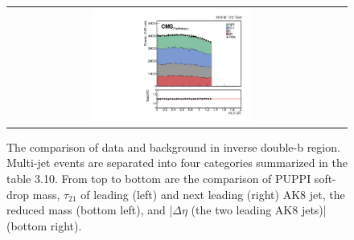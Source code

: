 \begin{figure}[t]
\begin{tabular}{cc}
    \includegraphics[width=0.5\textwidth]{Figures/dataMC_trig_antiDBT/deltaEta.pdf} \\
  \end{tabular}
  \caption{The comparison of data and background in inverse double-b region. Multi-jet events are separated into four categories summarized in the table 3.10. From top to bottom are the comparison of PUPPI soft-drop mass, $\tau _{21}$ of leading (left) and next leading (right) AK8 jet, the reduced mass (bottom left), and |$\Delta \eta $ (the two leading AK8 jets)| (bottom right).}
  \label{fig:hvt_brs}
\end{figure}

